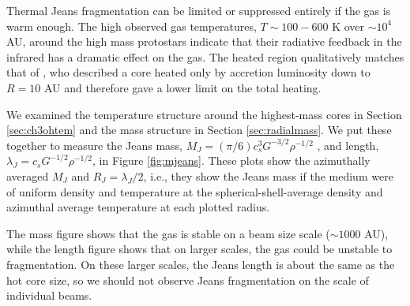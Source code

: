 \documentclass[twocolumn]{aastex61}
\begin{document}
Thermal Jeans fragmentation can be limited or suppressed entirely if the gas is
warm enough.  The high observed gas temperatures, $T\sim100-600$ K over
$\sim10^4$ AU, around the high mass protostars indicate that their radiative
feedback in the infrared has a dramatic effect on the gas.  The heated region
qualitatively matches that of \citet{Krumholz2006a}, who described
a core heated only by accretion luminosity down to $R=10$ AU and therefore
gave a lower limit on the total heating. 

We examined the temperature structure around the highest-mass cores in Section
\ref{sec:ch3ohtem} and the mass structure in Section \ref{sec:radialmass}.  We
put these together to measure the Jeans mass, $M_J = (\pi / 6) c_s^3
G^{-3/2} \rho^{-1/2}$
, and length, $\lambda_J = c_s G^{-1/2} \rho^{-1/2}$, 
in
Figure \ref{fig:mjeans}.  These plots show the azimuthally averaged $M_J$
and $R_J=\lambda_J/2$,
i.e., they show the Jeans mass if the medium
were of uniform density and temperature at the spherical-shell-average density
and azimuthal average temperature at each plotted radius.

The mass figure shows that the gas is stable on a beam size scale ($\sim1000$
AU), while the length figure shows that on larger scales, the gas could be
unstable to fragmentation.  On these larger scales, the Jeans length is about
the same as the hot core size, so we should not observe Jeans fragmentation on
the scale of individual beams.


\end{document}
